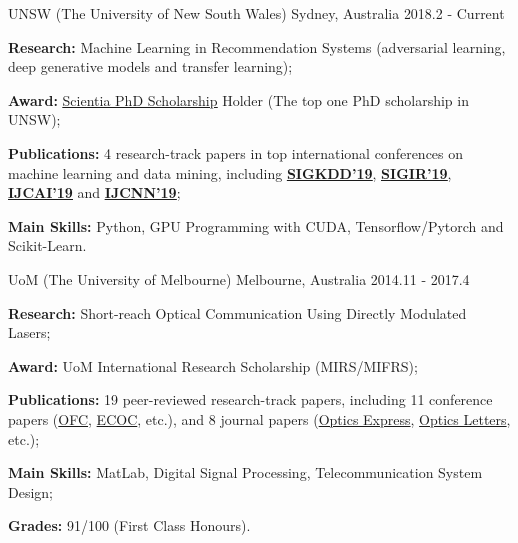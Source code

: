 

\begin{cventries}

    {UNSW (The University of New South Wales)} %
    {Sydney, Australia} %
    {2018.2 - Current} %
    {
      \begin{cvitems} %
        \item \textbf{Research:} Machine Learning in Recommendation Systems (adversarial learning, deep generative models and transfer learning);
        \item \textbf{Award:} \href{https://www.scientia.unsw.edu.au/scientia-phd-scholarships}{\underline{Scientia PhD Scholarship}} Holder (The top one PhD scholarship in UNSW);
        \item \textbf{Publications:}  4 research-track papers in top international conferences on machine learning and data mining, including \href{https://www.kdd.org/kdd2019/}{\underline{\bfseries SIGKDD'19}}, \href{https://sigir.org/sigir2019/}{\underline{\bfseries SIGIR'19}}, \href{https://ijcai19.org/}{\underline{\bfseries IJCAI'19}} and \href{https://www.ijcnn.org/}{\underline{\bfseries IJCNN'19}};
        \item \textbf{Main Skills:} Python, GPU Programming with CUDA, Tensorflow/Pytorch and Scikit-Learn.
      \end{cvitems}
    }

    {UoM (The University of Melbourne)}%
    {Melbourne, Australia}%
    {2014.11 - 2017.4}%
    {
      \begin{cvitems}
        \item \textbf{Research:} Short-reach Optical Communication Using Directly Modulated Lasers;
        \item \textbf{Award:} UoM International Research Scholarship (MIRS/MIFRS);
        \item \textbf{Publications:} 19 peer-reviewed research-track papers, including 11 conference papers (\href{https://www.ofcconference.org/en-us/home/}{OFC}, \href{https://www.ecocexhibition.com/conference/}{ECOC}, etc.), and 8 journal papers (\href{https://www.osapublishing.org/oe/home.cfm}{Optics Express}, \href{https://www.osapublishing.org/ol/home.cfm}{Optics Letters}, etc.);
        \item \textbf{Main Skills:} MatLab, Digital Signal Processing, Telecommunication System Design;
        \item \textbf{Grades:} 91/100 (First Class Honours).
      \end{cvitems}
    }


\end{cventries}
